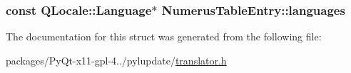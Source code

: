 \subsubsection[{languages}]{\setlength{\rightskip}{0pt plus 5cm}const Q\+Locale\+::\+Language$\ast$ Numerus\+Table\+Entry\+::languages}\label{structNumerusTableEntry_ae064718eb2615e2b0930b18821ffbb3a}


The documentation for this struct was generated from the following file\+:\begin{DoxyCompactItemize}
\item 
packages/\+Py\+Qt-\/x11-\/gpl-\/4../pylupdate/\hyperlink{translator_8h}{translator.\+h}\end{DoxyCompactItemize}
